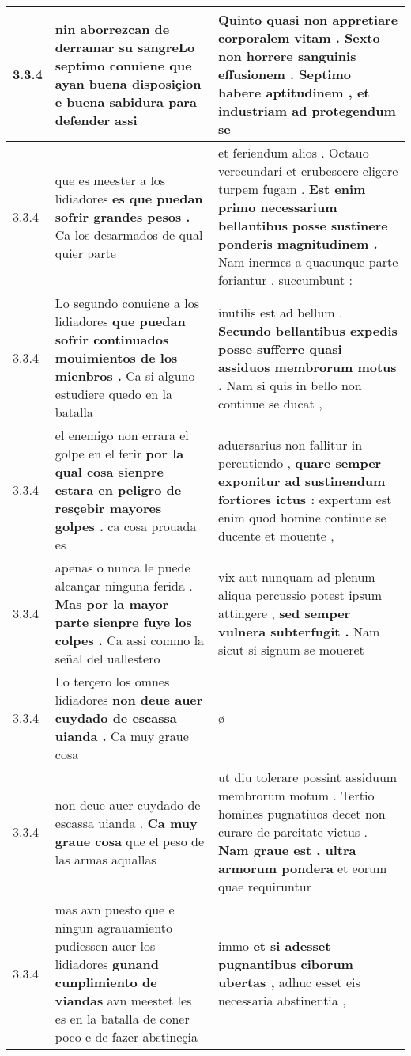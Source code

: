 \begin{tabular}{|p{1cm}|p{6.5cm}|p{6.5cm}|}
3.3.4 & nin aborrezcan de derramar su sangreLo septimo conuiene \textbf{ que ayan buena disposiçion e buena sabidura } para defender assi & Quinto \textbf{ quasi non appretiare corporalem vitam . Sexto non horrere sanguinis effusionem . Septimo habere aptitudinem , } et industriam ad protegendum se \\\hline
3.3.4 & que es meester a los lidiadores \textbf{ es que puedan sofrir grandes pesos . } Ca los desarmados de qual quier parte & et feriendum alios . Octauo verecundari et erubescere eligere turpem fugam . \textbf{ Est enim primo necessarium bellantibus posse sustinere ponderis magnitudinem . } Nam inermes a quacunque parte foriantur , succumbunt : \\\hline
3.3.4 & Lo segundo conuiene a los lidiadores \textbf{ que puedan sofrir continuados mouimientos de los mienbros . } Ca si alguno estudiere quedo en la batalla & inutilis est ad bellum . \textbf{ Secundo bellantibus expedis posse sufferre quasi assiduos membrorum motus . } Nam si quis in bello non continue se ducat , \\\hline
3.3.4 & el enemigo non errara el golpe en el ferir \textbf{ por la qual cosa sienpre estara en peligro de resçebir mayores golpes . } ca cosa prouada es & aduersarius non fallitur in percutiendo , \textbf{ quare semper exponitur ad sustinendum fortiores ictus : } expertum est enim quod homine continue se ducente et mouente , \\\hline
3.3.4 & apenas o nunca le puede alcançar ninguna ferida . \textbf{ Mas por la mayor parte sienpre fuye los colpes . } Ca assi commo la señal del uallestero & vix aut nunquam ad plenum aliqua percussio potest ipsum attingere , \textbf{ sed semper vulnera subterfugit . } Nam sicut si signum se moueret \\\hline
3.3.4 & Lo terçero los omnes lidiadores \textbf{ non deue auer cuydado de escassa uianda . } Ca muy graue cosa & ø \\\hline
3.3.4 & non deue auer cuydado de escassa uianda . \textbf{ Ca muy graue cosa } que el peso de las armas aquallas & ut diu tolerare possint assiduum membrorum motum . Tertio homines pugnatiuos decet non curare de parcitate victus . \textbf{ Nam graue est , ultra armorum pondera } et eorum quae requiruntur \\\hline
3.3.4 & mas avn puesto que e ningun agrauamiento pudiessen auer los lidiadores \textbf{ gunand cunplimiento de viandas } avn meestet les es en la batalla de coner poco e de fazer abstineçia & immo \textbf{ et si adesset pugnantibus ciborum ubertas , } adhuc esset eis necessaria abstinentia , \\\hline

\end{tabular}
